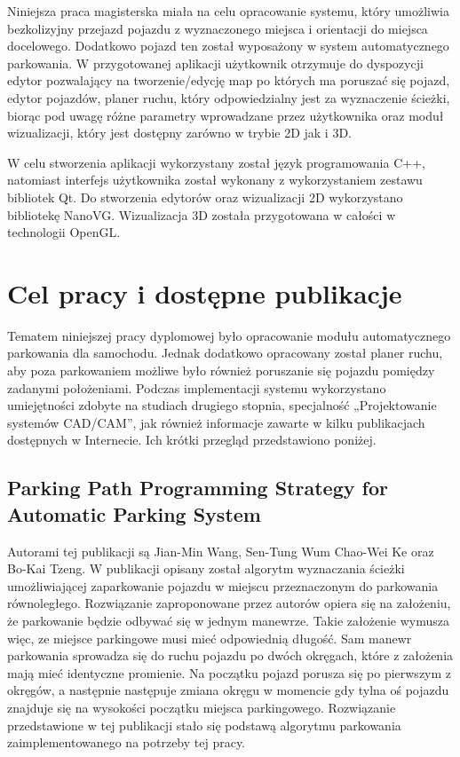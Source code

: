 \documentclass[a4paper,11pt,twoside]{report}
\theoremstyle{definition}
\begin{document}
Niniejsza praca magisterska miała na celu opracowanie systemu, który umożliwia bezkolizyjny przejazd pojazdu z wyznaczonego miejsca i orientacji do miejsca docelowego. Dodatkowo pojazd ten został wyposażony w system automatycznego parkowania. W przygotowanej aplikacji użytkownik otrzymuje do dyspozycji edytor pozwalający na tworzenie/edycję map po których ma poruszać się pojazd, edytor pojazdów, planer ruchu, który odpowiedzialny jest za wyznaczenie ścieżki, biorąc pod uwagę różne parametry wprowadzane przez użytkownika oraz moduł wizualizacji, który jest dostępny zarówno w trybie 2D jak i 3D. 

W celu stworzenia aplikacji wykorzystany został język programowania C++, natomiast interfejs użytkownika został wykonany z wykorzystaniem zestawu bibliotek Qt. Do stworzenia edytorów oraz wizualizacji 2D wykorzystano bibliotekę NanoVG. Wizualizacja 3D została przygotowana w całości w technologii OpenGL.

\chapter{Cel pracy i dostępne publikacje}

Tematem niniejszej pracy dyplomowej było opracowanie modułu automatycznego parkowania dla samochodu. Jednak dodatkowo opracowany został planer ruchu, aby poza parkowaniem możliwe było również poruszanie się pojazdu pomiędzy zadanymi położeniami. Podczas implementacji systemu wykorzystano umiejętności zdobyte na studiach drugiego stopnia, specjalność „Projektowanie systemów CAD/CAM”, jak również informacje zawarte w kilku publikacjach dostępnych w Internecie. Ich krótki przegląd przedstawiono poniżej. 

\section{Parking Path Programming Strategy for Automatic Parking System}

Autorami tej publikacji są Jian-Min Wang, Sen-Tung Wum Chao-Wei Ke oraz Bo-Kai Tzeng. W publikacji opisany został algorytm wyznaczania ścieżki umożliwiającej zaparkowanie pojazdu w miejscu przeznaczonym do parkowania równoległego. Rozwiązanie zaproponowane przez autorów opiera się na założeniu, że parkowanie będzie odbywać się w jednym manewrze. Takie założenie wymusza więc, ze miejsce parkingowe musi mieć odpowiednią długość. Sam manewr parkowania sprowadza się do ruchu pojazdu po dwóch okręgach, które z założenia mają mieć identyczne promienie. Na początku pojazd porusza się po pierwszym z okręgów, a następnie następuje zmiana okręgu w momencie gdy tylna oś pojazdu znajduje się na wysokości początku miejsca parkingowego. Rozwiązanie przedstawione w tej publikacji stało się podstawą algorytmu parkowania zaimplementowanego na potrzeby tej pracy.
 
\end{document}
